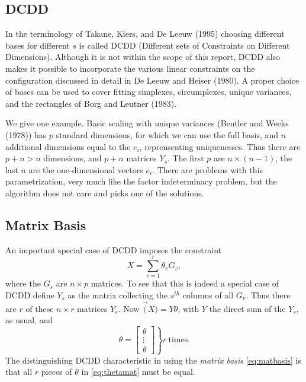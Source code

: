 \documentclass[
  12pt,
]{article}
\begin{document}
\subsection{DCDD}\label{dcdd}

In the terminology of Takane, Kiers, and De Leeuw (1995) choosing different bases for different \(s\) is called DCDD (Different sets of Constraints on Different Dimensions). Although it is not within the scope of this report, DCDD also makes it possible to incorporate the various linear constraints on the configuration discussed in detail in De Leeuw and Heiser (1980). A proper choice of bases can be used to cover fitting simplexes, circumplexes, unique variances, and the rectangles of Borg and Leutner (1983).

We give one example. Basic scaling with unique variances (Bentler and Weeks (1978)) has \(p\) standard
dimensions, for which we can use the full basis, and \(n\) additional dimensions equal to the \(e_i\),
reprensenting uniquenesses. Thus there are \(p+n>n\) dimensions, and \(p+n\) matrices \(Y_s\). The
first \(p\) are \(n\times(n-1)\), the last \(n\) are the one-dimensional vectors \(e_i\). There are problems
with this parametrization, very much like the factor indeterminacy problem, but the algorithm
does not care and picks one of the solutions.

\subsection{Matrix Basis}\label{matrix-basis}

An important special case of DCDD imposes the constraint
\begin{equation}
X=\sum_{v=1}^r\theta_vG_v,
\label{eq:matbasis}
\end{equation}
where the \(G_s\) are \(n\times p\) matrices. To see that this is indeed a special case
of DCDD define \(Y_s\) as the matrix collecting the \(s^{th}\) columns of all \(G_v\). Thus
there are \(r\) of these \(n\times r\) matrices \(Y_s\). Now \(\vec(X)=Y\theta\), with \(Y\)
the direct sum of the \(Y_s\), as usual, and
\begin{equation}
\theta=\left.\begin{bmatrix}\theta\\\vdots\\\theta\end{bmatrix}\right\}r\ \text{times}.
\label{eq:thetamat}
\end{equation}
The distinguishing DCDD characteristic in using the \emph{matrix basis} \eqref{eq:matbasis} is that all \(r\) pieces of \(\theta\) in \eqref{eq:thetamat} must be equal.
\end{document}
